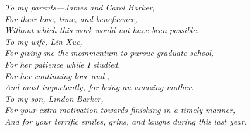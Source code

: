 \documentclass[phd,tocprelim]{cornell}
\theoremstyle{break}
\theoremstyle{empty}
\begin{document}
\begin{dedication}
\begin{center}
\textit{To my parents---James and Carol Barker, \\
For their love, time, and beneficence, \\
Without which this work would not have been possible. \\
\vspace{10 mm} 
To my wife, Lin Xue, \\
For giving me the mommentum to pursue graduate school, \\
For her patience while I studied, \\
For her continuing love and , \\
And most importantly, for being an amazing mother.\\
\vspace{10 mm} 
To my son, Lindon Barker, \\
For your extra motivation towards finishing in a timely manner, \\
And for your terrific smiles, grins, and laughs during this last year.}
\end{center}
\end{dedication}
\end{document}

